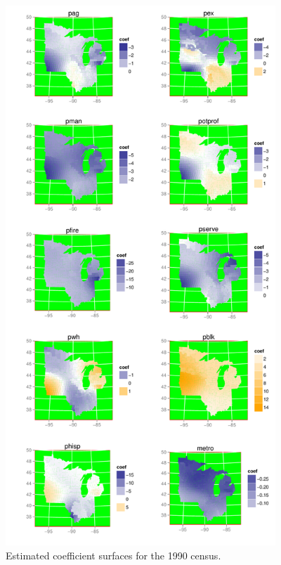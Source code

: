 \documentclass[authoryear, review, 11pt]{elsarticle}
\begin{document}
	\begin{figure}
		\begin{center}
			\includegraphics[height=8in]{../../figures/poverty/1990.linear.coefficients.pdf}
			\caption{Estimated coefficient surfaces for the 1990 census.\label{fig:1990}}
		\end{center}
	\end{figure}
	
\end{document}
